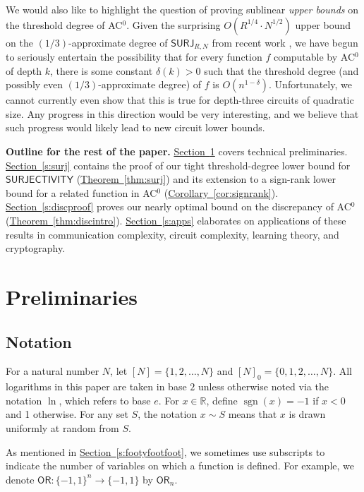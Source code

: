 \documentclass[11pt]{article}
\numberwithin{equation}{section}
\theoremstyle{definition}
\theoremstyle{plain}
\newcommand{\R}{\mathbb R}
\newcommand{\expref}[2]{\hyperref[#2]{#1~\ref{#2}}}
\newcommand{\sgn}{\mathrm{sign}}
\newcommand{\SURJ}{\mathsf{ SURJ}}
\newcommand{\OR}{\mathsf{ OR}}
\newcommand{\bits}{\{-1,1\}}
\renewcommand{\sgn}{\operatorname{sgn}}
\begin{document}
\medskip

We would also like to highlight the question of proving sublinear \emph{upper bounds} on the threshold degree of AC$^0$. 
Given the surprising $O(R^{1/4} \cdot N^{1/2})$ upper bound on the $(1/3)$-approximate degree of $\SURJ_{R, N}$ from
recent %
work %
\cite{algopoly, bkt}, we have begun to seriously entertain the possibility that for every function $f$ computable by AC$^0$ of depth $k$, there is some constant $\delta(k)>0$ such that the threshold degree (and possibly even $(1/3)$-approximate degree) of $f$ is $O(n^{1-\delta})$. 
Unfortunately, we cannot currently even show that this is true for 
depth-three %
circuits of quadratic size. Any progress in this direction would be very interesting,
and we believe that such progress would likely lead to new circuit lower bounds.


\medskip \noindent \textbf{Outline for the rest of the paper.}
\expref{Section}{sec:prelims} covers technical preliminaries. \expref{Section}{s:surj}
contains the proof of our tight threshold-degree %
lower bound for $\mathsf{SURJECTIVITY}$ (\expref{Theorem}{thm:surj})
and its extension to a sign-rank lower bound for a related function in AC$^0$ (\expref{Corollary}{cor:signrank}). 
\expref{Section}{s:discproof} proves our nearly optimal bound on the discrepancy of AC$^0$ (\expref{Theorem}{thm:discintro}).
\expref{Section}{s:apps} elaborates on applications of these results in communication complexity, circuit complexity, learning theory, and cryptography.

\section{Preliminaries}
\label{sec:prelims}
\subsection{Notation}
For a natural number $N$, let $[N] = \{1, 2, \dots, N\}$ and $[N]_0 = \{0, 1, 2, \dots, N\}$. All logarithms in this paper are taken in base $2$ unless otherwise noted via
the notation $\ln$, which refers to base $e$. 
For $x \in \R$, define $\sgn(x) = -1$ if $x < 0$ and 1 otherwise. For any set $S$, the notation $x \sim S$ means
that $x$ is drawn uniformly at random from $S$. 

As mentioned in \expref{Section}{s:footyfootfoot}, we sometimes use subscripts to indicate the number of variables on which a function is defined. 
For example, we denote $\OR \colon \bits^n \to \bits$ by $\OR_n$.
\end{document}
